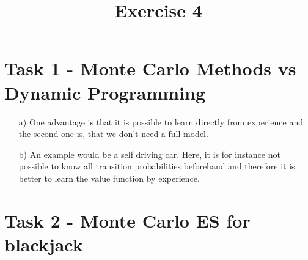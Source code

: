 \documentclass[a4paper]{article}
\date{}
\author{}
\title{\textbf{Exercise 4}}
\begin{document}
\maketitle 
\thispagestyle{fancy}

\section*{Task 1 - Monte Carlo Methods vs Dynamic Programming}

\begin{enumerate}
	\item[a)] One advantage is that it is possible to learn directly from experience and the second one is, that we don't need a full model. 
	\item[b)] An example would be a self driving car.
	Here, it is for instance not possible to know all transition probabilities beforehand and therefore it is better to learn the value function by experience.
		
\end{enumerate}

\section*{Task 2 - Monte Carlo ES for blackjack}
\end{document}
